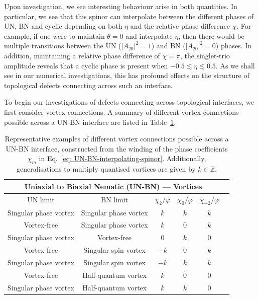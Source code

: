 Upon investigation, we see interesting behaviour arise in both quantities.
In particular, we see that this spinor can interpolate between the different
phases of UN, BN and cyclic depending on both \(\eta \) and the relative phase
difference \(\chi \).
For example, if one were to maintain \(\theta=0\) and interpolate \(\eta \),
then there would be multiple transitions between the UN (\(|A_{20}|^2 = 1\)) and
BN (\(|A_{20}|^2 = 0\)) phases.
In addition, maintaining a relative phase difference of \(\chi=\pi \), the
singlet-trio amplitude reveals that a cyclic phase is present when
\(-0.5 \lesssim \eta \lesssim 0.5\).
As we shall see in our numerical investigations, this has profound effects on
the structure of topological defects connecting across such an interface.

To begin our investigations of defects connecting across topological interfaces,
we first consider vortex connections.
A summary of different vortex connections possible across a UN-BN interface are
listed in Table~\ref{tab: UN-BN-vortices}.
\begin{table}
    \centering
    \begin{tabular}{cccccc}
        \toprule
        \multicolumn{5}{c}{Uniaxial to Biaxial Nematic (UN-BN) --- Vortices} \\
        \midrule
        UN limit & BN limit &  \(\chi_2/\varphi \) & \(\chi_0/\varphi \) &
        \(\chi_{-2}/\varphi \)  \\
        \midrule
         Singular phase vortex & Singular phase vortex & \(k\) & \(k\) &
         \(k\) \\ 
         Vortex-free & Singular phase vortex & \(k\) & 0 & \(k\) \\
         Singular phase vortex & Vortex-free & 0 & \(k\) & 0\\
         Vortex-free & Singular spin vortex  & \(-k\) & 0 & \(k\) \\
         Singular phase vortex & Singular spin vortex  & \(-k\) & \(k\) &
         \(k\) \\
         Vortex-free & Half-quantum vortex  & \(k\) & 0 & 0\\
         Singular phase vortex & Half-quantum vortex  & \(k\) & \(k\) & 0 \\
        \bottomrule
    \end{tabular}
    \caption{\label{tab: UN-BN-vortices}
    Representative examples of different vortex connections possible across a
    UN-BN interface, constructed from the winding of the phase coefficients
    \(\chi_m\) in Eq.~\eqref{eq: UN-BN-interpolating-spinor}.
    Additionally, generalisations to multiply quantised vortices are given by
    \(k \in \mathbb{Z}\).}
\end{table}
